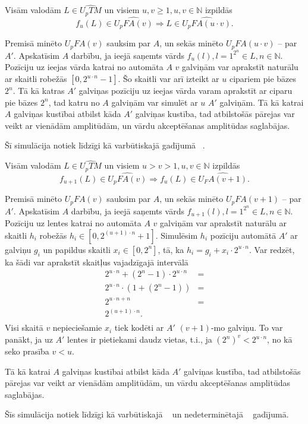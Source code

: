 \documentclass{ludis}
\begin{document}
\begin{lemma}
Visām valodām $L \in \widehat{U_pTM}$ un visiem $u, v \geq 1, u, v \in \mathbb{N}$ izpildās
\[
	f_u(L) \in \widehat{U_pFA(v)} \Rightarrow L \in \widehat{U_pFA(u \cdot v)}.
\]
\end{lemma}
\begin{pieradijums}
Premisā minēto $U_pFA(v)$ sauksim par $A$, un sekās minēto $U_pFA(u \cdot v)$ -- par $A'$. %
Apskatīsim $A$ darbību, ja ieejā saņemts vārds $f_u(l), l = 1^{2^n} \in L, n \in \mathbb{N}$. Pozīciju uz ieejas vārda katrai no automāta $A$ $v$ galviņām var aprakstīt naturālu ar skaitli robežās $\left[0, 2^{u \cdot n} -1 \right]$. Šo skaitli var arī izteikt ar $u$ cipariem pie bāzes $2^n$. Tā kā katras $A'$ galviņas pozīciju uz ieejas vārda varam aprakstīt ar ciparu pie bāzes $2^n$, tad katru no $A$ galviņām var simulēt ar $u$ $A'$ galviņām. Tā kā katrai $A$ galviņas kustībai atbilst kāda $A'$ galviņas kustība, tad atbilstošās pārejas var veikt ar vienādām amplitūdām, un vārdu akceptēšanas amplitūdas saglabājas.

Šī simulācija notiek līdzīgi kā varbūtiskajā gadījumā ~\citep{Macarie1995}. %
\end{pieradijums}

\begin{lemma}
Visām valodām $L \in \widehat{U_pTM}$ un visiem $u > v > 1, u, v \in \mathbb{N}$ izpildās
\[
	f_{u+1}(L) \in \widehat{U_pFA(v)} \Rightarrow f_u(L) \in \widehat{U_FA(v + 1)}.
\]
\end{lemma}
\begin{pieradijums}
Premisā minēto $U_pFA(v)$ sauksim par $A$, un sekās minēto $U_pFA(v + 1)$ -- par $A'$. %
Apskatīsim $A$ darbību, ja ieejā saņemts vārds $f_{u+1}(l), l = 1^{2^n} \in L, n \in \mathbb{N}$. Pozīciju uz lentes katrai no automāta $A$ $v$ galviņām var aprakstīt naturālu ar skaitli $h_i$ robežās $h_i \in \left[0, 2^{(u + 1) \cdot n} + 1 \right]$. Simulēsim $h_i$ pozīciju automātā $A'$ ar galviņu $g_i$ un papildus skaitli $x_i \in \left[ 0, 2^n \right]$, tā, ka $h_i = g_i + x_i \cdot 2^{u \cdot n}$. Var redzēt, ka šādi var aprakstīt skaitļus vajadzīgajā intervālā
\begin{align*}
	2^{u \cdot n} + (2^n - 1) \cdot 2^{u \cdot n} & =\\
	2^{u \cdot n} \cdot (1 + (2^n - 1)) & =\\
	2^{u \cdot n + n} & =\\
	2^{(u + 1) \cdot n}.\\
\end{align*}
Visi skaitā $v$ nepieciešamie $x_i$ tiek kodēti ar $A'$ $(v+1)$-mo galviņu. To var panākt, ja uz $A'$ lentes ir pietiekami daudz vietas, t.i., ja $(2^n)^v < 2^{u \cdot n}$, no kā seko prasība $v < u$.

Tā kā katrai $A$ galviņas kustībai atbilst kāda $A'$ galviņas kustība, tad atbilstošās pārejas var veikt ar vienādām amplitūdām, un vārdu akceptēšanas amplitūdas saglabājas.

Šīs simulācija notiek līdzīgi kā varbūtiskajā ~\citep{Macarie1995} un nedeterminētajā ~\citep{Monien1980} gadījumā.
\end{pieradijums}

\printbibliography
\end{document}
